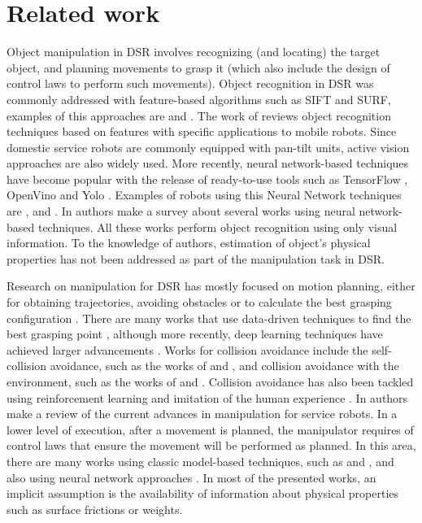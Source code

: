 \documentclass[smallextended]{svjour3}       %
\begin{document}
\section{Related work}
\label{sec:RelatedWork}
Object manipulation in DSR involves recognizing (and locating) the target object, and planning movements to grasp it (which also include the design of control laws to perform such movements). Object recognition in DSR was commonly addressed with feature-based algorithms such as SIFT and SURF, examples of this approaches are \cite{stuckler_mobile_2016} and \cite{ruiz-del-solar_bender_2013}. The work of \cite{loncomilla_object_2016} reviews object recognition techniques based on features with specific applications to mobile robots. Since domestic service robots are commonly equipped with pan-tilt units, active vision approaches are also widely used. More recently, neural network-based techniques have become popular with the release of ready-to-use tools such as TensorFlow \cite{abadi2016tensorflow}, OpenVino and Yolo \cite{redmon2016you}. Examples of robots using this Neural Network techniques are \cite{homerunikoblenz_2019}, \cite{tobi_tdp2019} and \cite{tech_united_tdp2020}. In \cite{hamidreza2020state} authors make a survey about several works using neural network-based techniques. All these works perform object recognition using only visual information. To the knowledge of authors, estimation of object's physical properties has not been addressed as part of the manipulation task in DSR.

Research on manipulation for DSR has mostly focused on motion planning, either for obtaining trajectories, avoiding obstacles or to calculate the best grasping configuration \cite{billard_trends_2019}. There are many works that use data-driven techniques to find the best grasping point \cite{bohg2013data,sahbani2012overview}, although more recently, deep learning techniques have achieved larger advancements \cite{nguyen_review_2019}. Works for collision avoidance include the self-collision avoidance, such as the works of \cite{mirrazavi2018unified} and \cite{rakita2018relaxedik}, and collision avoidance with the environment, such as the works of \cite{di2017real} and \cite{nikou2017nonlinear}. Collision avoidance has also been tackled using reinforcement learning \cite{yamada2020motion} and imitation of the human experience \cite{huang2020real}. In \cite{hamidreza2020state} authors make a review of the current advances in manipulation for service robots. In a lower level of execution, after a movement is planned, the manipulator requires of control laws that ensure the movement will be performed as planned. In this area, there are many works using classic model-based techniques, such as \cite{varela2018modelling,seo2018dual,lee2017adaptive} and \cite{han2017assumed}, and also using neural network approaches \cite{jin2018robot,khan2020tracking,jin2021robust}. In most of the presented works, an implicit assumption is the availability of information about physical properties such as surface frictions or weights. 
\end{document}
